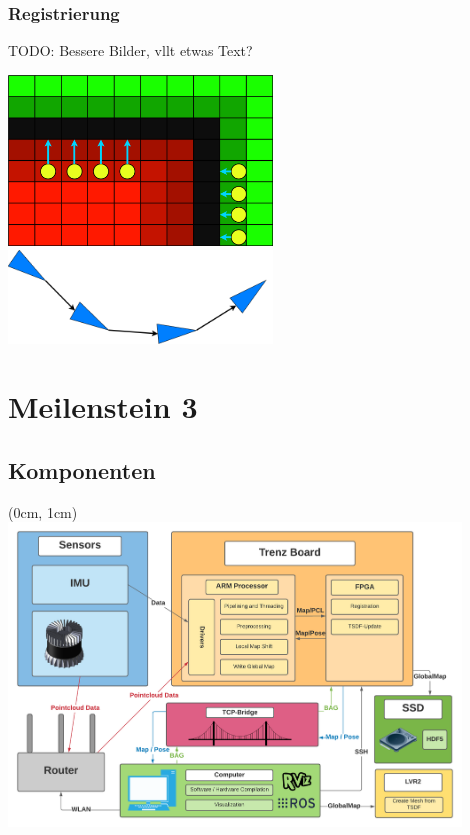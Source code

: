 \documentclass{beamer}
\begin{document}
\subsubsection*{Registrierung}
\begin{frame}{\subsubsecname}
TODO: Bessere Bilder, vllt etwas Text?
\begin{center}
\includegraphics[width=7cm]{images/Reg_Gradient.png}
\includegraphics[width=7cm]{images/Pose_Graph.png}
\end{center}
\end{frame}

\section{Meilenstein 3}
\begin{frame}
\centering
\color{dark}\LARGE\textbf{\secname}
\end{frame}

\subsection{Komponenten}
\begin{frame}{\subsecname}
\begin{textblock*}{12.8cm}(0cm, 1cm)
\centering
\includegraphics[width=12cm]{images/Architecture.pdf}
\end{textblock*}
\end{frame}
\end{document}
